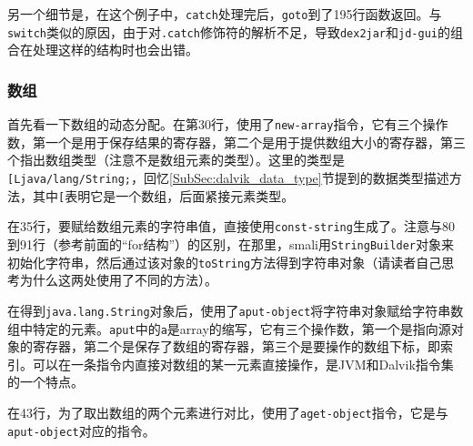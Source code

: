 另一个细节是，在这个例子中，\lstinline!catch!处理完后，\lstinline!goto!到了195行函数返回。与\lstinline!switch!类似的原因，由于对\lstinline!.catch!修饰符的解析不足，导致\lstinline!dex2jar!和\lstinline!jd-gui!的组合在处理这样的结构时也会出错。

\subsubsection{数组}



首先看一下数组的动态分配。在第30行，使用了\lstinline!new-array!指令，它有三个操作数，第一个是用于保存结果的寄存器，第二个是用于提供数组大小的寄存器，第三个指出数组类型（注意不是数组元素的类型）。这里的类型是\lstinline![Ljava/lang/String;!，回忆\ref{SubSec:dalvik_data_type}节提到的数据类型描述方法，其中\lstinline![!表明它是一个数组，后面紧接元素类型。

在35行，要赋给数组元素的字符串值，直接使用\lstinline!const-string!生成了。注意与80到91行（参考前面的“for结构”）的区别，在那里，smali用\lstinline!StringBuilder!对象来初始化字符串，然后通过该对象的\lstinline!toString!方法得到字符串对象（请读者自己思考为什么这两处使用了不同的方法）。

在得到\lstinline!java.lang.String!对象后，使用了\lstinline!aput-object!将字符串对象赋给字符串数组中特定的元素。\lstinline!aput!中的\lstinline!a!是array的缩写，它有三个操作数，第一个是指向源对象的寄存器，第二个是保存了数组的寄存器，第三个是要操作的数组下标，即索引。可以在一条指令内直接对数组的某一元素直接操作，是JVM和Dalvik指令集的一个特点。

在43行，为了取出数组的两个元素进行对比，使用了\lstinline!aget-object!指令，它是与\lstinline!aput-object!对应的指令。

